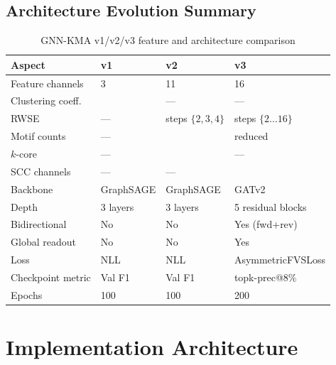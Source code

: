 \documentclass[10pt,a4paper]{report}
\theoremstyle{definition}
\begin{document}
\section{Architecture Evolution Summary}

\begin{table}[H]
	\centering
	\caption{GNN-KMA v1/v2/v3 feature and architecture comparison}
	\label{tab:gnn_compare}
	\begin{tabular}{llll}
		\toprule
		\textbf{Aspect}   & \textbf{v1} & \textbf{v2}       & \textbf{v3}           \\
		\midrule
		Feature channels  & 3           & 11                & 16                    \\
		Clustering coeff. & \checkmark  & ---               & ---                   \\
		RWSE              & ---         & steps $\{2,3,4\}$ & steps $\{2\ldots16\}$ \\
		Motif counts      & ---         & \checkmark        & reduced               \\
		$k$-core          & ---         & \checkmark        & ---                   \\
		SCC channels      & ---         & ---               & \checkmark            \\
		Backbone          & GraphSAGE   & GraphSAGE         & GATv2                 \\
		Depth             & 3 layers    & 3 layers          & 5 residual blocks     \\
		Bidirectional     & No          & No                & Yes (fwd+rev)         \\
		Global readout    & No          & No                & Yes                   \\
		Loss              & NLL         & NLL               & AsymmetricFVSLoss     \\
		Checkpoint metric & Val F1      & Val F1            & topk-prec@8\%         \\
		Epochs            & 100         & 100               & 200                   \\
		\bottomrule
	\end{tabular}
\end{table}

\chapter{Implementation Architecture}
\label{ch:implementation}
\end{document}
